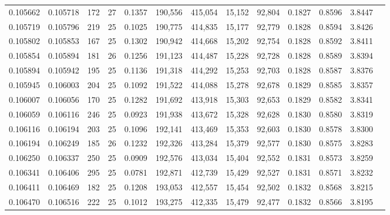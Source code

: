 \begin{tabular}{rrrrrrrrrrrrr}
0.105662 & 0.105718 & 172 &  27 &                                     0.1357 & 190,556 & 415,054 &  15,152 &  92,804 & 0.1827 & 0.8596 & 3.8447 \\
0.105719 & 0.105796 & 219 &  25 &                                     0.1025 & 190,775 & 414,835 &  15,177 &  92,779 & 0.1828 & 0.8594 & 3.8426 \\
0.105802 & 0.105853 & 167 &  25 &                                     0.1302 & 190,942 & 414,668 &  15,202 &  92,754 & 0.1828 & 0.8592 & 3.8411 \\
0.105854 & 0.105894 & 181 &  26 &                                     0.1256 & 191,123 & 414,487 &  15,228 &  92,728 & 0.1828 & 0.8589 & 3.8394 \\
0.105894 & 0.105942 & 195 &  25 &                                     0.1136 & 191,318 & 414,292 &  15,253 &  92,703 & 0.1828 & 0.8587 & 3.8376 \\
0.105945 & 0.106003 & 204 &  25 &                                     0.1092 & 191,522 & 414,088 &  15,278 &  92,678 & 0.1829 & 0.8585 & 3.8357 \\
0.106007 & 0.106056 & 170 &  25 &                                     0.1282 & 191,692 & 413,918 &  15,303 &  92,653 & 0.1829 & 0.8582 & 3.8341 \\
0.106059 & 0.106116 & 246 &  25 &                                     0.0923 & 191,938 & 413,672 &  15,328 &  92,628 & 0.1830 & 0.8580 & 3.8319 \\
0.106116 & 0.106194 & 203 &  25 &                                     0.1096 & 192,141 & 413,469 &  15,353 &  92,603 & 0.1830 & 0.8578 & 3.8300 \\
0.106194 & 0.106249 & 185 &  26 &                                     0.1232 & 192,326 & 413,284 &  15,379 &  92,577 & 0.1830 & 0.8575 & 3.8283 \\
0.106250 & 0.106337 & 250 &  25 &                                     0.0909 & 192,576 & 413,034 &  15,404 &  92,552 & 0.1831 & 0.8573 & 3.8259 \\
0.106341 & 0.106406 & 295 &  25 &                                     0.0781 & 192,871 & 412,739 &  15,429 &  92,527 & 0.1831 & 0.8571 & 3.8232 \\
0.106411 & 0.106469 & 182 &  25 &                                     0.1208 & 193,053 & 412,557 &  15,454 &  92,502 & 0.1832 & 0.8568 & 3.8215 \\
0.106470 & 0.106516 & 222 &  25 &                                     0.1012 & 193,275 & 412,335 &  15,479 &  92,477 & 0.1832 & 0.8566 & 3.8195 \\

\end{tabular}
